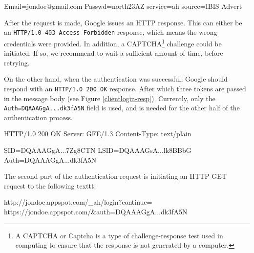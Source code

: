 \begin{figure*}[ht] %
\begin{center}
\begin{code}
Email=jondoe@gmail.com
Passwd=north23AZ
service=ah
source=IBIS Advert
\end{code}
\caption{Authentication Data for ClientLogin.\label{clientlogin-req}}
\end{center}
\end{figure*}

After the request is made, Google issues an HTTP response. This can either be
an \texttt{HTTP/1.0 403 Access Forbidden} response, which means the wrong
credentials were provided. In addition, a CAPTCHA\footnote{A CAPTCHA or Captcha
is a type of challenge-response test used in computing to ensure that the
response is not generated by a computer.} challenge could be initiated. If so,
we recommend to wait a sufficient amount of time, before retrying.

On the other hand, when the authentication was successful, Google should respond
with an \texttt{HTTP/1.0 200 OK} response. After which three tokens are passed
in the message body (see Figure \ref{clientlogin-resp}). Currently, only the
\texttt{Auth=DQAAAGgA...dk3fA5N} field is used, and is needed for the other
half of the authentication process.

\begin{figure*}[ht] %
\begin{center}
\begin{code}
HTTP/1.0 200 OK
Server: GFE/1.3
Content-Type: text/plain

SID=DQAAAGgA...7Zg8CTN
LSID=DQAAAGsA...lk8BBbG
Auth=DQAAAGgA...dk3fA5N
\end{code}
\caption{ClientLogin Response.\label{clientlogin-resp}}
\end{center}
\end{figure*}

The second part of the authentication request is initiating an HTTP GET request
to the following texttt:

\begin{center}
\begin{code}
http://jondoe.appspot.com/_ah/login?continue=
    https://jondoe.appspot.com/&auth=DQAAAGgA...dk3fA5N
\end{code}
\end{center}

